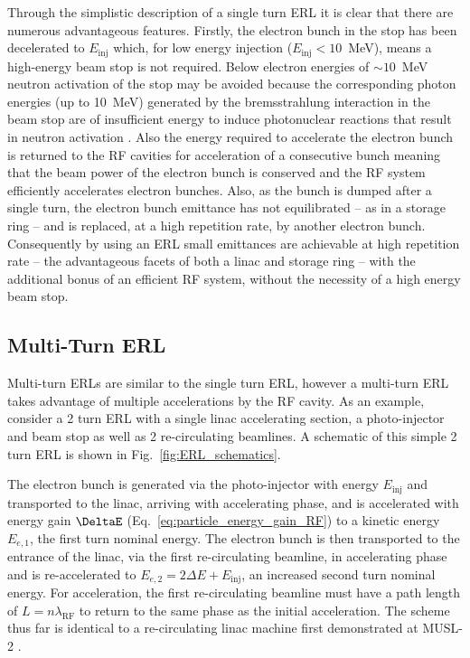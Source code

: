 \documentclass[../main.tex]{subfiles}
\begin{document}
Through the simplistic description of a single turn ERL it is clear that there are numerous advantageous features. Firstly, the electron bunch in the stop has been decelerated to $E_{\mathrm{inj}}$ which, for low energy injection ($E_{\mathrm{inj}}<10$~\si{\mega\electronvolt}), means a high-energy beam stop is not required. Below electron energies of $\sim10$~\si{\mega\electronvolt} neutron activation of the stop may be avoided because the corresponding photon energies (up to 10~\si{\mega\electronvolt}) generated by the bremsstrahlung interaction in the beam stop are of insufficient energy to induce photonuclear reactions that result in neutron activation \cite{ahlgren1988induced}. Also the energy required to accelerate the electron bunch is returned to the RF cavities for acceleration of a consecutive bunch meaning that the beam power of the electron bunch is conserved and the RF system efficiently accelerates electron bunches. Also, as the bunch is dumped after a single turn, the electron bunch emittance  has not equilibrated -- as in a storage ring \cite{owen2013nonequilibrium} -- and is replaced, at a high repetition rate, by another electron bunch. Consequently by using an ERL small emittances are achievable at high repetition rate -- the advantageous facets of both a linac and storage ring -- with the additional bonus of an efficient RF system, without the necessity of a high energy beam stop. 

\subsection{Multi-Turn ERL}
\label{sec:multi_turn_ERL}

Multi-turn ERLs are similar to the single turn ERL, however a multi-turn ERL takes advantage of multiple accelerations by the RF cavity. As an example, consider a 2 turn ERL with a single linac accelerating section, a photo-injector and beam stop as well as 2 re-circulating beamlines. A schematic of this simple 2 turn ERL is shown in Fig.~\ref{fig:ERL_schematics}.  

The electron bunch is generated via the photo-injector with energy $E_{\mathrm{inj}}$ and transported to the linac, arriving with accelerating phase, and is accelerated with energy gain $\DeltaE$ (Eq.~\ref{eq:particle_energy_gain_RF}) to a kinetic energy $E_{e,1}$, the first turn nominal energy. The electron bunch is then transported to the entrance of the linac, via the first re-circulating beamline, in accelerating phase and is re-accelerated to $E_{e,2}=2\Delta E+E_{\mathrm{inj}}$, an increased second turn nominal energy. For acceleration, the first re-circulating beamline must have a path length of $L = n\lambda_{\mathrm{RF}}$ to return to the same phase as the initial acceleration. The scheme thus far is identical to a re-circulating linac machine first demonstrated at MUSL-2 \cite{axel1977status}.
\end{document}
